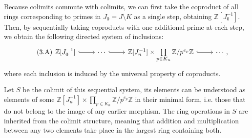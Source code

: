 \documentclass{amsart}
\newcommand{\Z}{{\mathbb Z}}
\begin{document}
    Because colimits commute with colimits, we can first take the coproduct of all rings corresponding to primes in $J_0 = J \setminus K$ as a single step, obtaining $\Z[J_0^{-1}]$.
    Then, by sequentially taking coproducts with one additional prime at each step, we obtain the following directed system of inclusions:
    \[
    \tag{3.A}\label{SD}
    \begin{tikzcd}
    {\Z[J_0^{-1}]} \arrow[r, hook] & \cdots \arrow[r, hook] & {\Z[J_n^{-1}] \times \prod\limits_{p \in K_n} \Z/p^{e_p}\Z} \arrow[r, hook] & \cdots,
    \end{tikzcd}
    \]
    where each inclusion is induced by the universal property of coproducts.
    
    Let $S$ be the colimit of this sequential system, its elements can be understood as elements of some $\Z[J_n^{-1}] \times \prod\limits_{p \in K_n} \Z/p^{e_p}\Z$ in their minimal form, i.e. those that do not belong to the image of any earlier morphism.  
    The ring operations in $S$ are inherited from the colimit structure, meaning that addition and multiplication between any two elements take place in the largest ring containing both.
\end{document}
